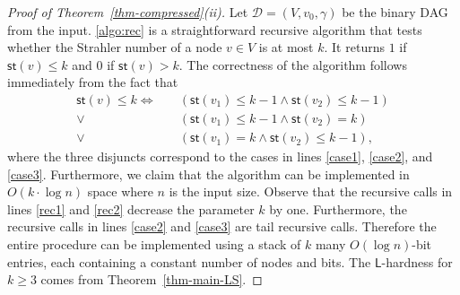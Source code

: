 \documentclass[a4paper,UKenglish,cleveref, autoref, thm-restate, numberwithinsect]{lipics-v2021}
\newcommand{\hs}{\mathsf{st}}
\newcommand{\LS}{\mathsf{L}}
\begin{document}
\begin{proof}[Proof of Theorem~\ref{thm-compressed}(ii)]
Let $\mathcal{D} = (V, v_0,\gamma)$ be the binary DAG from the input.
\cref{algo:rec} is a straightforward recursive algorithm that tests whether the Strahler number of a node $v \in V$ is at most $k$. It returns 
$1$ if $\hs(v) \le k$ and $0$ if $\hs(v) > k$.
The correctness of the algorithm follows immediately from the fact that
\begin{align*}
	\hs(v) \le k \iff \quad & (\hs(v_1) \le k-1 \wedge \hs(v_2) \le k-1) \\
	\vee ~ & (\hs(v_1) \le k-1 \wedge \hs(v_2) = k) \\
	\vee ~ & (\hs(v_1) = k \wedge \hs(v_2) \le k-1) ,
\end{align*}
where the three disjuncts correspond to the cases in lines \ref{case1}, \ref{case2}, and \ref{case3}.
Furthermore, we claim that the algorithm can be implemented in $O(k \cdot \log n)$ space
where $n$ is the input size.
Observe that the recursive calls in lines \ref{rec1} and \ref{rec2} decrease the parameter $k$ by one.
Furthermore, the recursive calls in lines \ref{case2} and \ref{case3} are tail recursive calls.
Therefore the entire procedure can be implemented using a stack of $k$ many $O(\log n)$-bit entries, each containing a constant number
of nodes and bits.
The $\LS$-hardness for $k \geq 3$ comes from Theorem~\ref{thm-main-LS}.
\end{proof}
\end{document}
